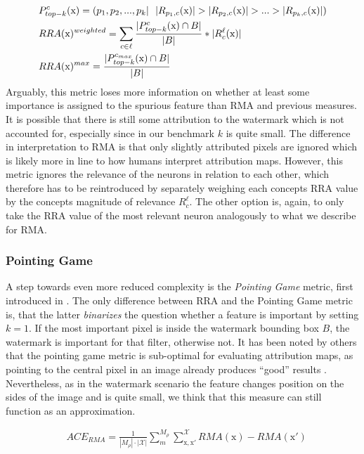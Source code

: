 \begin{align}
& P_{top-k}^{c}(\mathrm{x}) = (p_1, p_2,...,p_k | \ \  |R_{p_1,c}(\mathrm{x})| > |R_{p_2,c}(\mathrm{x})| > ... > |R_{p_k,c}(\mathrm{x})| ) \notag \\
& RRA(\mathrm{x})^{weighted} = \sum_{c \in \ell} \frac{|P_{top-k}^{c}(\mathrm{x}) \cap B|}{|B|} * |R_c^{\ell}(\mathrm{x})| \\
& RRA(\mathrm{x})^{max} = \frac{|P_{top-k}^{c_{max}}(\mathrm{x}) \cap B|}{|B|}
\end{align}
Arguably, this metric loses more information on whether at least some importance is assigned to the spurious feature than RMA and previous measures. It is possible that there is still some attribution to the watermark which is not accounted for, especially since in our benchmark $k$ is quite small. The difference in interpretation to RMA is that only slightly attributed pixels are ignored which is likely more in line to how humans interpret attribution maps. 
However, this metric ignores the relevance of the neurons in relation to each other, which therefore has to be reintroduced by separately weighing each concepts RRA value by the concepts magnitude of relevance $R_c^{\ell}$. The other option is, again, to only take the RRA value of the most relevant neuron analogously to what we describe for RMA. 

\subsubsection{Pointing Game}
A step towards even more reduced complexity is the \textit{Pointing Game} metric, first introduced in \citep{Zhang2016}. The only difference between RRA and the Pointing Game metric is, that the latter \textit{binarizes} the question whether a feature is important by setting $k = 1$. If the most important pixel is inside the watermark bounding box $B$, the watermark is important for that filter, otherwise not.
It has been noted by others that the pointing game metric is sub-optimal for evaluating attribution maps, as pointing to the central pixel in an image already produces ``good'' results \citep{Gu2019}. Nevertheless, as in the watermark scenario the feature changes position on the sides of the image and is quite small, we think that this measure can still function as an approximation. 


\begin{align}\label{eq:ace_rma}
& ACE_{RMA} = \frac{1}{|M_\rho|\cdot |\mathcal{X}| }\sum_{m}^{M_{\rho}} \sum_{\mathrm{x,x'}}^{\mathcal{X}} RMA(\mathrm{x}) - RMA(\mathrm{x'})
\end{align}

